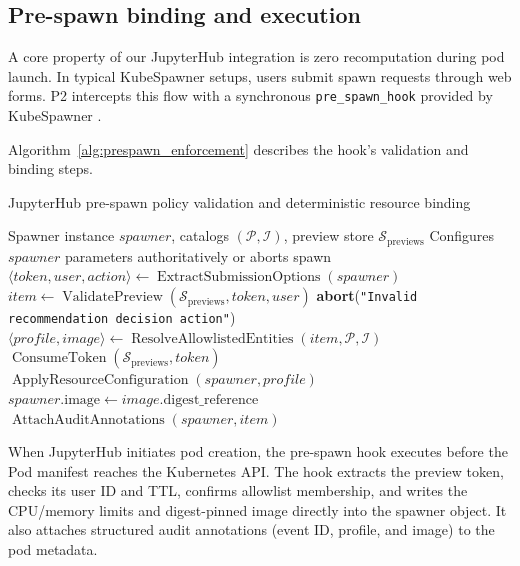 \subsection{Pre-spawn binding and execution}
\label{subsec:prespawn_binding}

A core property of our JupyterHub integration is zero recomputation during pod launch. In typical KubeSpawner setups, users submit spawn requests through web forms. P2 intercepts this flow with a synchronous \texttt{pre\_spawn\_hook} provided by KubeSpawner \cite{kspawner}.

Algorithm~\ref{alg:prespawn_enforcement} describes the hook's validation and binding steps.

\begin{algorithm}[ht]{JupyterHub pre-spawn policy validation and deterministic resource binding}
\label{alg:prespawn_enforcement}
\begin{algorithmic}[1]
\Require Spawner instance $spawner$, catalogs $(\mathcal{P}, \mathcal{I})$, preview store $\mathcal{S}_{\mathrm{previews}}$
\Ensure Configures $spawner$ parameters authoritatively or aborts spawn
\State $\langle token, user, action \rangle \gets \operatorname{ExtractSubmissionOptions}(spawner)$
\State $item \gets \operatorname{ValidatePreview}(\mathcal{S}_{\mathrm{previews}}, token, user)$ 
    \State \textbf{abort}(\texttt{"Invalid recommendation decision action"})
\EndIf
\State $\langle profile, image \rangle \gets \operatorname{ResolveAllowlistedEntities}(item, \mathcal{P}, \mathcal{I})$
\State $\operatorname{ConsumeToken}(\mathcal{S}_{\mathrm{previews}}, token)$ 
\State $\operatorname{ApplyResourceConfiguration}(spawner, profile)$ 
\State $spawner.\mathrm{image} \gets image.\mathrm{digest\_reference}$ 
\State $\operatorname{AttachAuditAnnotations}(spawner, item)$
\end{algorithmic}
\end{algorithm}

When JupyterHub initiates pod creation, the pre-spawn hook executes before the Pod manifest reaches the Kubernetes API. The hook extracts the preview token, checks its user ID and TTL, confirms allowlist membership, and writes the CPU/memory limits and digest-pinned image directly into the spawner object. It also attaches structured audit annotations (event ID, profile, and image) to the pod metadata.

